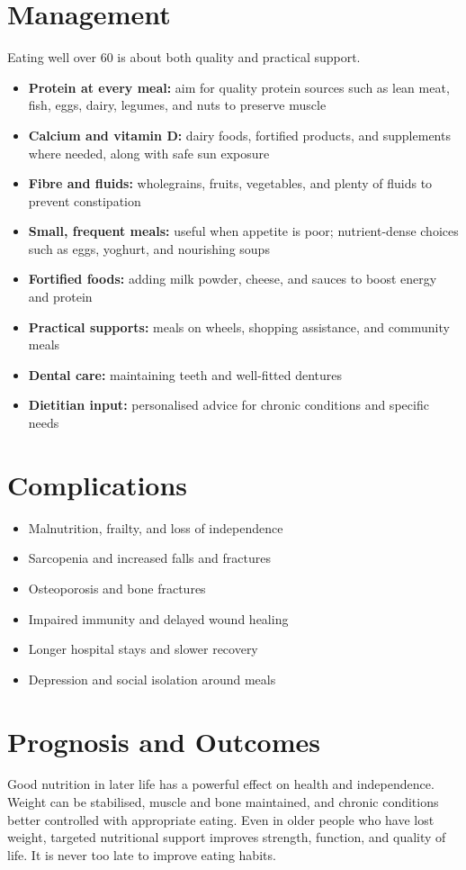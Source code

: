 \section*{Management}
Eating well over 60 is about both quality and practical support.
\begin{itemize}
    \item \textbf{Protein at every meal:} aim for quality protein sources such as lean meat, fish, eggs, dairy, legumes, and nuts to preserve muscle
    \item \textbf{Calcium and vitamin D:} dairy foods, fortified products, and supplements where needed, along with safe sun exposure
    \item \textbf{Fibre and fluids:} wholegrains, fruits, vegetables, and plenty of fluids to prevent constipation
    \item \textbf{Small, frequent meals:} useful when appetite is poor; nutrient-dense choices such as eggs, yoghurt, and nourishing soups
    \item \textbf{Fortified foods:} adding milk powder, cheese, and sauces to boost energy and protein
    \item \textbf{Practical supports:} meals on wheels, shopping assistance, and community meals
    \item \textbf{Dental care:} maintaining teeth and well-fitted dentures
    \item \textbf{Dietitian input:} personalised advice for chronic conditions and specific needs
\end{itemize}

\section*{Complications}
\begin{itemize}
    \item Malnutrition, frailty, and loss of independence
    \item Sarcopenia and increased falls and fractures
    \item Osteoporosis and bone fractures
    \item Impaired immunity and delayed wound healing
    \item Longer hospital stays and slower recovery
    \item Depression and social isolation around meals
\end{itemize}

\section*{Prognosis and Outcomes}
Good nutrition in later life has a powerful effect on health and independence. Weight can be stabilised, muscle and bone maintained, and chronic conditions better controlled with appropriate eating. Even in older people who have lost weight, targeted nutritional support improves strength, function, and quality of life. It is never too late to improve eating habits.

